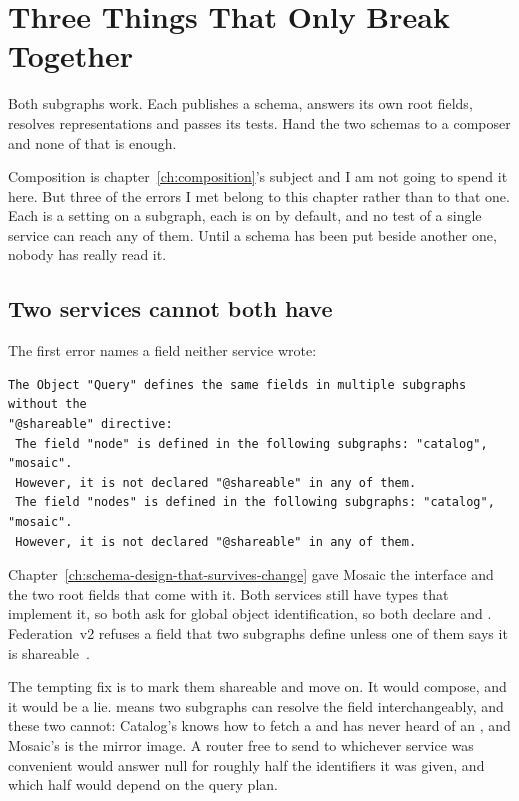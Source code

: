 \section{Three Things That Only Break Together}
\label{sec:ch08-only-breaks-together}
%

Both subgraphs work. Each publishes a schema, answers its own root fields,
resolves representations and passes its tests. Hand the two schemas to a
composer and none of that is enough.

Composition is chapter~\ref{ch:composition}'s subject and I am not going to
spend it here. But three of the errors I met belong to this chapter rather than
to that one. Each is a setting on a subgraph, each is on by default, and no
test of a single service can reach any of them. Until a schema has been put
beside another one, nobody has really read it.

\subsection*{Two services cannot both have }

%
The first error names a field neither service wrote:

\begin{verbatim}
The Object "Query" defines the same fields in multiple subgraphs without the
"@shareable" directive:
 The field "node" is defined in the following subgraphs: "catalog", "mosaic".
 However, it is not declared "@shareable" in any of them.
 The field "nodes" is defined in the following subgraphs: "catalog", "mosaic".
 However, it is not declared "@shareable" in any of them.
\end{verbatim}

Chapter~\ref{ch:schema-design-that-survives-change} gave Mosaic the 
interface and the two root fields that come with it. Both services still have
types that implement it, so both ask for global object identification, so both
declare  and . Federation~v2 refuses a field that two
subgraphs define unless one of them says it is
shareable~\autocite{apollo2026compositionrules}.

%
The tempting fix is to mark them shareable and move on. It would compose, and it
would be a lie.  means two subgraphs can resolve the field
interchangeably, and these two cannot: Catalog's  knows how to fetch
a  and has never heard of an , and Mosaic's is the
mirror image. A router free to send  to whichever service was
convenient would answer null for roughly half the identifiers it was given, and
which half would depend on the query plan.

